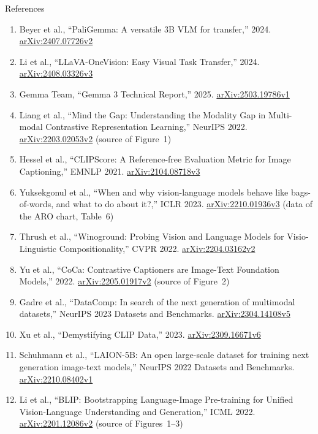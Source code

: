 \begin{frame}[allowframebreaks]{References}
\begin{enumerate}
    \item Beyer et al., ``PaliGemma: A versatile 3B VLM for transfer,'' 2024. \href{https://arxiv.org/abs/2407.07726v2}{arXiv:2407.07726v2}
    \item Li et al., ``LLaVA-OneVision: Easy Visual Task Transfer,'' 2024. \href{https://arxiv.org/abs/2408.03326v3}{arXiv:2408.03326v3}
    \item Gemma Team, ``Gemma 3 Technical Report,'' 2025. \href{https://arxiv.org/abs/2503.19786v1}{arXiv:2503.19786v1}
    \item Liang et al., ``Mind the Gap: Understanding the Modality Gap in Multi-modal Contrastive Representation Learning,'' NeurIPS 2022. \href{https://arxiv.org/abs/2203.02053v2}{arXiv:2203.02053v2} (source of Figure~1)
    \item Hessel et al., ``CLIPScore: A Reference-free Evaluation Metric for Image Captioning,'' EMNLP 2021. \href{https://arxiv.org/abs/2104.08718v3}{arXiv:2104.08718v3}
    \item Yuksekgonul et al., ``When and why vision-language models behave like bags-of-words, and what to do about it?,'' ICLR 2023. \href{https://arxiv.org/abs/2210.01936v3}{arXiv:2210.01936v3} (data of the ARO chart, Table~6)
    \item Thrush et al., ``Winoground: Probing Vision and Language Models for Visio-Linguistic Compositionality,'' CVPR 2022. \href{https://arxiv.org/abs/2204.03162v2}{arXiv:2204.03162v2}
    \item Yu et al., ``CoCa: Contrastive Captioners are Image-Text Foundation Models,'' 2022. \href{https://arxiv.org/abs/2205.01917v2}{arXiv:2205.01917v2} (source of Figure~2)
    \item Gadre et al., ``DataComp: In search of the next generation of multimodal datasets,'' NeurIPS 2023 Datasets and Benchmarks. \href{https://arxiv.org/abs/2304.14108v5}{arXiv:2304.14108v5}
    \item Xu et al., ``Demystifying CLIP Data,'' 2023. \href{https://arxiv.org/abs/2309.16671v6}{arXiv:2309.16671v6}
    \item Schuhmann et al., ``LAION-5B: An open large-scale dataset for training next generation image-text models,'' NeurIPS 2022 Datasets and Benchmarks. \href{https://arxiv.org/abs/2210.08402v1}{arXiv:2210.08402v1}
    \item Li et al., ``BLIP: Bootstrapping Language-Image Pre-training for Unified Vision-Language Understanding and Generation,'' ICML 2022. \href{https://arxiv.org/abs/2201.12086v2}{arXiv:2201.12086v2} (source of Figures~1--3)

\end{enumerate}
\end{frame}
